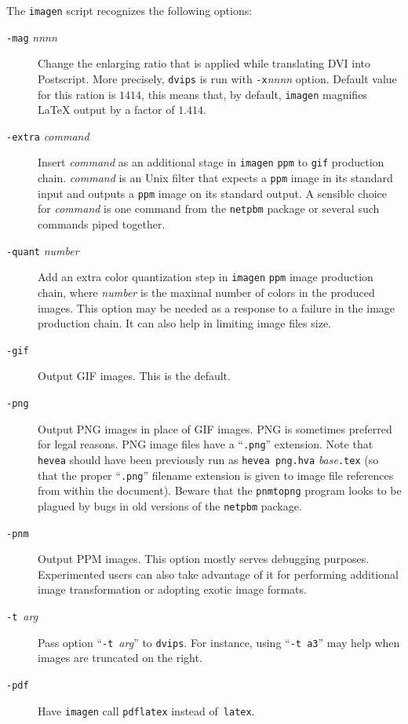 The \texttt{imagen} script recognizes the following options:
\begin{description}
\item[{\tt -mag} {\sl nnnn}] Change the enlarging ratio that is applied
while translating DVI into Postscript.
More precisely,  \texttt{dvips} is run with \texttt{-x}{\sl nnnn}
option.
Default value for this ration is $1414$, this means
that, by default, \texttt{imagen} magnifies \LaTeX{} output by a factor of
$1.414$.
\item[{\tt -extra} {\it command}] Insert {\it command} as an additional
stage in \texttt{imagen} \texttt{ppm} to \texttt{gif} production chain.
\textit{command} is an Unix filter that expects a \texttt{ppm} image
in its standard input and outputs a \texttt{ppm} image on its standard output.
A sensible choice for \textit{command} is one command from the
\texttt{netpbm} package or several such commands piped together.
\item[{\tt -quant} {\it number}] Add an extra color quantization step
in \texttt{imagen} \texttt{ppm} image production chain, where
\textit{number} is the maximal number of colors in the produced
images. This option may be needed as a response to a failure in the
image production chain. It can also help in limiting image files size.
\item[{\tt -gif}] Output GIF images. This is the default.
\item[{\tt -png}]
Output PNG images in place of GIF images.
PNG is sometimes preferred for legal reasons.
PNG image files have a ``\texttt{.png}'' extension.
Note that \texttt{hevea} should have been previously run as
\texttt{hevea png.hva} \textit{base}\texttt{.tex} (so that the proper
``\texttt{.png}'' filename
extension is given to image file references from within the \html{}
document).
Beware that the \texttt{pnmtopng} program looks to be plagued by bugs
in old versions of the \texttt{netpbm} package.
\item[{\tt -pnm}] Output PPM images. This option mostly serves
debugging purposes. Experimented users can also take advantage
of it for performing additional image transformation or
adopting exotic image formats.
\item[{\tt -t}~{\it arg}] Pass option ``{\tt -t}~{\it arg}'' to
\texttt{dvips}.
For instance, using ``\texttt{-t a3}'' may help when images are
truncated on the right.
\item[{\tt -pdf}]
Have \texttt{imagen} call \texttt{pdflatex} instead
of~\texttt{latex}.
\end{description}

